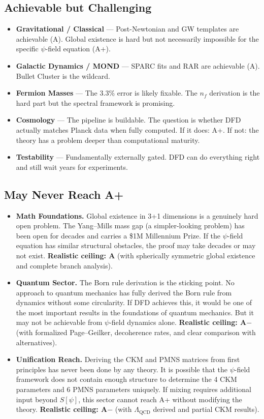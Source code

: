 \documentclass[11pt,a4paper]{article}
\begin{document}
\subsection{Achievable but Challenging}
\begin{itemize}
    \item \textbf{Gravitational / Classical} --- Post-Newtonian and GW templates are achievable (A). Global existence is hard but not necessarily impossible for the specific $\psi$-field equation (A+).
    \item \textbf{Galactic Dynamics / MOND} --- SPARC fits and RAR are achievable (A). Bullet Cluster is the wildcard.
    \item \textbf{Fermion Masses} --- The 3.3\% error is likely fixable. The $n_f$ derivation is the hard part but the spectral framework is promising.
    \item \textbf{Cosmology} --- The pipeline is buildable. The question is whether DFD actually matches Planck data when fully computed. If it does: A+. If not: the theory has a problem deeper than computational maturity.
    \item \textbf{Testability} --- Fundamentally externally gated. DFD can do everything right and still wait years for experiments.
\end{itemize}

\subsection{May Never Reach A+}
\begin{itemize}
    \item \textbf{Math Foundations.} Global existence in 3+1 dimensions is a genuinely hard open problem. The Yang--Mills mass gap (a simpler-looking problem) has been open for decades and carries a \$1M Millennium Prize. If the $\psi$-field equation has similar structural obstacles, the proof may take decades or may not exist. \textbf{Realistic ceiling: A} (with spherically symmetric global existence and complete branch analysis).

    \item \textbf{Quantum Sector.} The Born rule derivation is the sticking point. No approach to quantum mechanics has fully derived the Born rule from dynamics without some circularity. If DFD achieves this, it would be one of the most important results in the foundations of quantum mechanics. But it may not be achievable from $\psi$-field dynamics alone. \textbf{Realistic ceiling: A$-$} (with formalized Page--Geilker, decoherence rates, and clear comparison with alternatives).

    \item \textbf{Unification Reach.} Deriving the CKM and PMNS matrices from first principles has never been done by any theory. It is possible that the $\psi$-field framework does not contain enough structure to determine the 4 CKM parameters and 6 PMNS parameters uniquely. If mixing requires additional input beyond $S[\psi]$, this sector cannot reach A+ without modifying the theory. \textbf{Realistic ceiling: A$-$} (with $\Lambda_{\text{QCD}}$ derived and partial CKM results).
\end{itemize}
\end{document}
